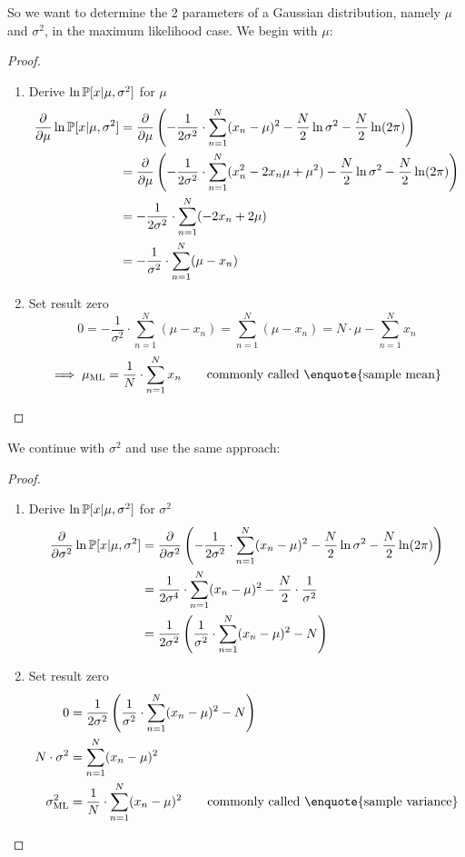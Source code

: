 So we want to determine the 2 parameters of a Gaussian distribution, namely $\mu$ and $\sigma^2$, in the maximum likelihood case.
We begin with $\mu$:

\begin{proof}
\begin{enumerate}
  \item Derive $\ln{\mathbb P[x| \mu, \sigma^2]}$ for $\mu$
    \begin{align*}
      \frac\partial{\partial \mu} \ln{\mathbb P[x | \mu, \sigma^2]}
      &= \frac\partial{\partial \mu} \left(-\frac{1}{2\sigma^2} \cdot \sum_{n=1}^N (x_n - \mu)^2 - \frac{N}{2} \ln{\sigma^2} - \frac{N}{2} \ln(2\pi)\right) \\
      &= \frac\partial{\partial \mu} \left(-\frac{1}{2\sigma^2} \cdot \sum_{n=1}^N (x_n^2 - 2 x_n \mu + \mu^2) - \frac{N}{2} \ln{\sigma^2} - \frac{N}{2} \ln(2\pi)\right) \\
      &= -\frac{1}{2\sigma^2} \cdot \sum_{n=1}^N (-2x_n + 2\mu) \\
      &= -\frac1{\sigma^2} \cdot \sum_{n=1}^N (\mu - x_n)
    \end{align*}
  \item Set result zero
    \[ 0 = -\frac{1}{\sigma^2} \cdot \sum_{n=1}^N (\mu - x_n) = \sum_{n=1}^N (\mu - x_n) = N \cdot \mu - \sum_{n=1}^N x_n \]
    \[ \implies \mu_{\text{ML}} = \frac1N \cdot \sum_{n=1}^N x_n \qquad \text{commonly called \enquote{sample mean}} \]
\end{enumerate}
\end{proof}

We continue with $\sigma^2$ and use the same approach:

\begin{proof}
  \begin{enumerate}
  \item Derive $\ln{\mathbb P[x | \mu, \sigma^2]}$ for $\sigma^2$
    \begin{align*}
      \frac{\partial}{\partial \sigma^2} \ln{\mathbb P[x | \mu, \sigma^2]}
      &= \frac{\partial}{\partial \sigma^2} \left(-\frac{1}{2\sigma^2} \cdot \sum_{n=1}^N (x_n - \mu)^2 - \frac{N}2 \ln{\sigma^2} - \frac{N}2 \ln(2\pi)\right) \\
      &= \frac{1}{2\sigma^4} \cdot \sum_{n=1}^N (x_n - \mu)^2 - \frac{N}{2} \cdot \frac{1}{\sigma^2} \\
      &= \frac{1}{2\sigma^2} \left(\frac{1}{\sigma^2} \cdot \sum_{n=1}^N (x_n - \mu)^2 - N\right)
    \end{align*}
  \item Set result zero
    \begin{align*}
      0 &= \frac{1}{2\sigma^2} \left(\frac{1}{\sigma^2} \cdot \sum_{n=1}^N (x_n - \mu)^2 - N\right) \\
      N \cdot \sigma^2 &= \sum_{n=1}^N (x_n - \mu)^2 \\
      \sigma^2_{\text{ML}} &= \frac{1}{N} \cdot \sum_{n=1}^N (x_n - \mu)^2 \qquad \text{commonly called \enquote{sample variance}}
    \end{align*}
  \end{enumerate}
\end{proof}

